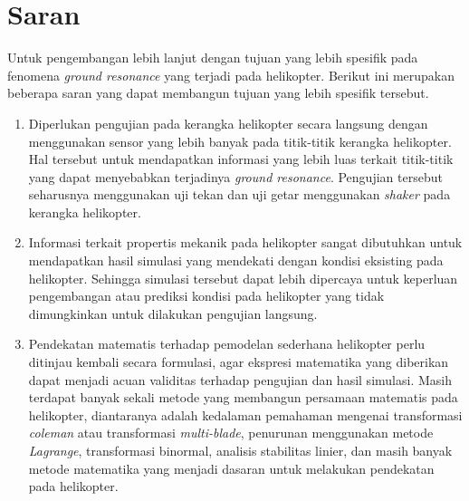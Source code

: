 \section{Saran}
\label{chap:saran}

Untuk pengembangan lebih lanjut dengan tujuan yang lebih spesifik pada fenomena \textit{ground resonance} yang terjadi pada helikopter. Berikut ini merupakan beberapa saran yang dapat membangun tujuan yang lebih spesifik tersebut.

\begin{enumerate}[nolistsep]

  \item Diperlukan pengujian pada kerangka helikopter secara langsung dengan menggunakan sensor yang lebih banyak pada titik-titik kerangka helikopter. Hal tersebut untuk mendapatkan informasi yang lebih luas terkait titik-titik yang dapat menyebabkan terjadinya \textit{ground resonance}. Pengujian tersebut seharusnya menggunakan uji tekan dan uji getar menggunakan \textit{shaker} pada kerangka helikopter.

  \item Informasi terkait propertis mekanik pada helikopter sangat dibutuhkan untuk mendapatkan hasil simulasi yang mendekati dengan kondisi eksisting pada helikopter. Sehingga simulasi tersebut dapat lebih dipercaya untuk keperluan pengembangan atau prediksi kondisi pada helikopter yang tidak dimungkinkan untuk dilakukan pengujian langsung.

  \item Pendekatan matematis terhadap pemodelan sederhana helikopter perlu ditinjau kembali secara formulasi, agar ekspresi matematika yang diberikan dapat menjadi acuan validitas terhadap pengujian dan hasil simulasi. Masih terdapat banyak sekali metode yang membangun persamaan matematis pada helikopter, diantaranya adalah kedalaman pemahaman mengenai transformasi \textit{coleman} atau transformasi \textit{multi-blade}, penurunan menggunakan metode \textit{Lagrange}, transformasi binormal, analisis stabilitas linier, dan masih banyak metode matematika yang menjadi dasaran untuk melakukan pendekatan pada helikopter.

\end{enumerate}
